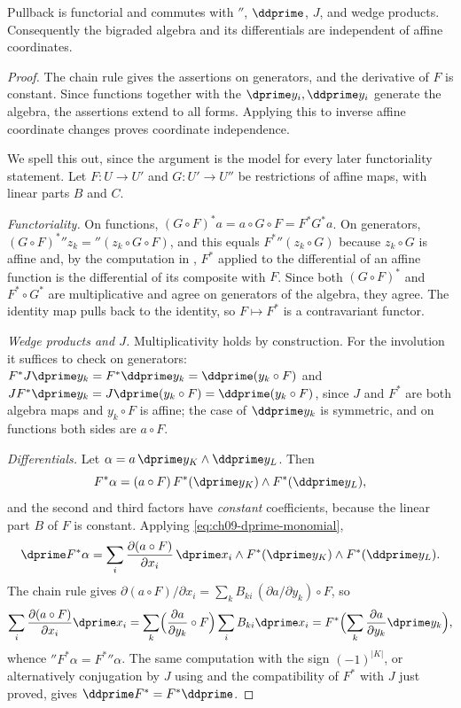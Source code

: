 \begin{proposition}
\label{prop:ch09-pullback-functorial}
Pullback is functorial and commutes with $\dprime$, $\ddprime$, $J$, and wedge products.
Consequently the bigraded algebra and its differentials are independent of
affine coordinates.
\end{proposition}
\begin{proof}
The chain rule gives the assertions on generators, and the derivative of
$F$ is constant. Since functions together with the $\dprime y_i,\ddprime y_i$ generate
the algebra, the assertions extend to all forms. Applying this to inverse
affine coordinate changes proves coordinate independence.

We spell this out, since the argument is the model for every later
functoriality statement.  Let $F:U\to U'$ and $G:U'\to U''$ be restrictions
of affine maps, with linear parts $B$ and $C$.

\emph{Functoriality.}  On functions, $(G\circ F)^*a=a\circ G\circ F=F^*G^*a$.
On generators, $(G\circ F)^*\dprime z_k=\dprime(z_k\circ G\circ F)$, and this
equals $F^*\dprime(z_k\circ G)$ because $z_k\circ G$ is affine and, by the
computation in , $F^*$ applied to the
differential of an affine function is the differential of its composite with
$F$.  Since both $(G\circ F)^*$ and $F^*\circ G^*$ are multiplicative and
agree on generators of the algebra, they agree.  The identity map pulls back
to the identity, so $F\mapsto F^*$ is a contravariant functor.

\emph{Wedge products and $J$.}  Multiplicativity holds by construction.  For
the involution it suffices to check on generators:
$F^*J\dprime y_k=F^*\ddprime y_k=\ddprime(y_k\circ F)$ and
$JF^*\dprime y_k=J\dprime(y_k\circ F)=\ddprime(y_k\circ F)$, since
$J$ and $F^*$ are both algebra maps and $y_k\circ F$ is affine; the case of
$\ddprime y_k$ is symmetric, and on functions both sides are $a\circ F$.

\emph{Differentials.}  Let $\alpha=a\,\dprime y_K\wedge\ddprime y_L$.  Then
\[
 F^*\alpha=(a\circ F)\,F^*(\dprime y_K)\wedge F^*(\ddprime y_L),
\]
and the second and third factors have \emph{constant} coefficients, because
the linear part $B$ of $F$ is constant.  Applying
\eqref{eq:ch09-dprime-monomial},
\[
 \dprime F^*\alpha
 =\sum_i\frac{\partial (a\circ F)}{\partial x_i}\,
   \dprime x_i\wedge F^*(\dprime y_K)\wedge F^*(\ddprime y_L).
\]
The chain rule gives
$\partial(a\circ F)/\partial x_i=\sum_kB_{ki}\,(\partial a/\partial y_k)\circ F$,
so
\[
 \sum_i\frac{\partial (a\circ F)}{\partial x_i}\dprime x_i
 =\sum_k\Bigl(\frac{\partial a}{\partial y_k}\circ F\Bigr)
   \sum_iB_{ki}\dprime x_i
 =F^*\Bigl(\sum_k\frac{\partial a}{\partial y_k}\dprime y_k\Bigr),
\]
whence $\dprime F^*\alpha=F^*\dprime\alpha$.  The same computation with the
sign $(-1)^{|K|}$, or alternatively conjugation by $J$ using
 and the compatibility of $F^*$ with $J$ just
proved, gives $\ddprime F^*=F^*\ddprime$.


\end{proof}
